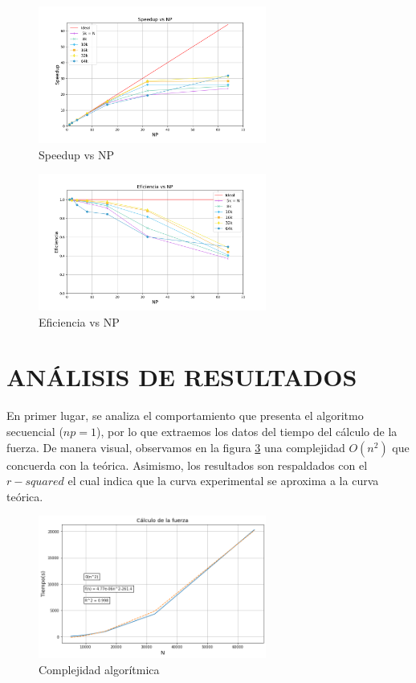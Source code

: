 \documentclass[conference]{IEEEtran}
\begin{document}
\begin{figure}[!ht]
    \centering
    \includegraphics[width =7.5cm]{Images/Speedup vs NP.png}
    \caption{Speedup vs NP}
    \label{fig:my_label}
\end{figure}

\begin{figure}[!ht]
    \centering
    \includegraphics[width =7.5cm]{Images/Eficiencia vs NP.png}
    \caption{Eficiencia vs NP}
    \label{fig:my_label}
\end{figure}

\newpage
\section{ANÁLISIS DE RESULTADOS}
En primer lugar, se analiza el comportamiento que presenta el algoritmo secuencial ($np=1$), por lo que extraemos los datos del tiempo del cálculo de la fuerza. De manera visual, observamos en la figura \ref{fig:complejidad} una complejidad $O(n^2)$ que concuerda con la teórica. Asimismo, los resultados son respaldados con el $r-squared$ el cual indica que la curva experimental se aproxima a la curva teórica. \\

\begin{figure}[!ht]
    \centering
    \includegraphics[width =7.5cm]{Images/complejidadv2.png}
    \caption{Complejidad algorítmica}
    \label{fig:complejidad}
\end{figure}
\end{document}
